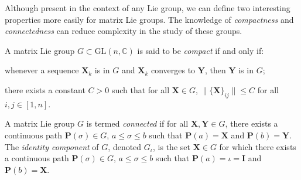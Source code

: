 Although present in the context of any Lie group, we can define two interesting properties more easily for matrix Lie groups. The knowledge of \emph{compactness} and \emph{connectedness} can reduce complexity in the study of these groups.
\begin{definition}
    A matrix Lie group $G\subset\text{GL}(n,\mathbb{C})$ is said to be \emph{compact} if and only if:
    \begin{property}
        \item whenever a sequence $\mathbf{X}_k$ is in $G$ and $\mathbf{X}_k$ converges to $\mathbf{Y}$, then $\mathbf{Y}$ is in $G$;
        \item there exists a constant $C>0$ such that for all $\mathbf{X}\in G$, $\|\{\mathbf{X}\}_{ij}\|\leq C$ for all $i,j\in[1,n]$.
    \end{property}
\end{definition}
\begin{definition}
    A matrix Lie group $G$ is termed \emph{connected} if for all $\mathbf{X},\mathbf{Y}\in G$, there exists a continuous path $\mathbf{P}(\sigma)\in G$, $a\le\sigma\le b$ such that $\mathbf{P}(a) = \mathbf{X}$ and $\mathbf{P}(b) = \mathbf{Y}$. The \emph{identity component} of $G$, denoted $G_\iota$, is the set $\mathbf{X}\in G$ for which there exists a continuous path $\mathbf{P}(\sigma)\in G$, $a\le\sigma\le b$ such that $\mathbf{P}(a) = \iota=\mathbf{I}$ and $\mathbf{P}(b) = \mathbf{X}$.
\end{definition}

